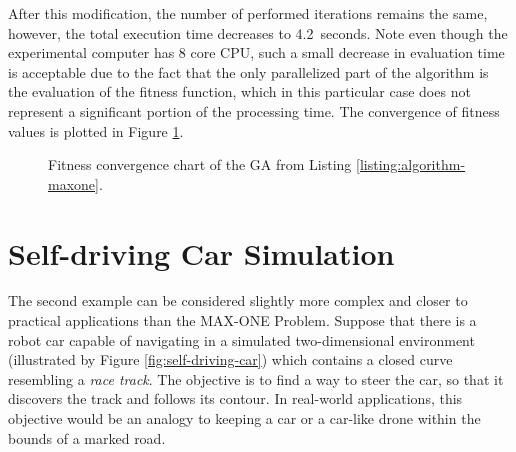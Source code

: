 After this modification, the number of performed iterations remains the same, however, the total execution time decreases to 4.2~seconds. Note even though the experimental computer has 8 core CPU, such a small decrease in evaluation time is acceptable due to the fact that the only parallelized part of the algorithm is the evaluation of the fitness function, which in this particular case does not represent a significant portion of the processing time. The convergence of fitness values is plotted in Figure \ref{fig:maxone-fitness}.

\begin{figure}[ht]
	\centering
	\caption[MAX-ONE genetic algorithm fitness convergence chart.]{Fitness convergence chart of the GA from Listing \ref{listing:algorithm-maxone}.}
	\label{fig:maxone-fitness}
\end{figure}

\section{Self-driving Car Simulation}
The second example can be considered slightly more complex and closer to practical applications than the MAX-ONE Problem. Suppose that there is a robot car capable of navigating in a simulated two-dimensional environment (illustrated by Figure \ref{fig:self-driving-car}) which contains a closed curve resembling a \textit{race track}. The objective is to find a way to steer the car, so that it discovers the track and follows its contour. In real-world applications, this objective would be an analogy to keeping a car or a car-like drone within the bounds of a marked road.

